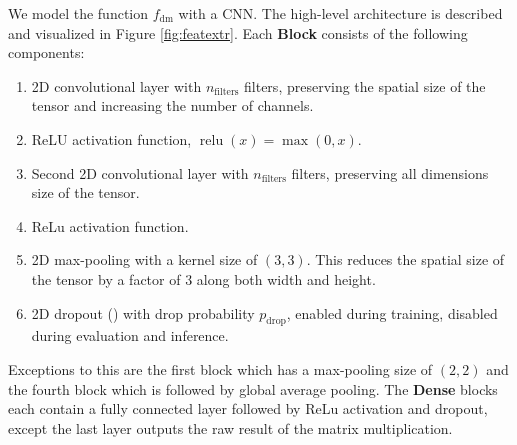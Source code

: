 We model the function $f_\text{dm}$ with a CNN. The high-level architecture is described and visualized in Figure \ref{fig:featextr}. Each \textbf{Block} consists of the following components:
\begin{enumerate}
    \item 2D convolutional layer with $n_\text{filters}$ filters, preserving the spatial size of the tensor and increasing the number of channels.
    \item ReLU activation function, $\operatorname{relu}(x)=\max(0,x)$.
    \item Second 2D convolutional layer with $n_\text{filters}$ filters, preserving all dimensions size of the tensor.
    \item ReLu activation function.
    \item 2D max-pooling with a kernel size of $(3,3)$. This reduces the spatial size of the tensor by a factor of $3$ along both width and height.
    \item 2D dropout (\cite{srivastava2014:dropout}) with drop probability $p_\text{drop}$, enabled during training, disabled during evaluation and inference.
\end{enumerate}
Exceptions to this are the first block which has a max-pooling size of $(2,2)$ and the fourth block which is followed by global average pooling. The \textbf{Dense} blocks each contain a fully connected layer followed by ReLu activation and dropout, except the last layer outputs the raw result of the matrix multiplication.

